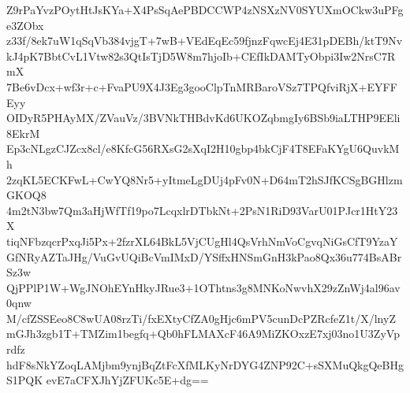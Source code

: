 Z9rPaYvzPOytHtJsKYa+X4PsSqAePBDCCWP4zNSXzNV0SYUXmOCkw3uPFge3ZObx
z33f/8ek7uW1qSqVb384vjgT+7wB+VEdEqEc59fjnzFqwcEj4E31pDEBh/ktT9Nv
kJ4pK7BbtCvL1Vtw82s3QtIsTjD5W8m7hjoIb+CEfIkDAMTyObpi3Iw2NrsC7RmX
7Be6vDcx+wf3r+c+FvaPU9X4J3Eg3gooClpTnMRBaroVSz7TPQfviRjX+EYFFEyy
OIDyR5PHAyMX/ZVauVz/3BVNkTHBdvKd6UKOZqbmgIy6BSb9iaLTHP9EEli8EkrM
Ep3cNLgzCJZcx8cl/e8KfcG56RXsG2sXqI2H10gbp4bkCjF4T8EFaKYgU6QuvkMh
2zqKL5ECKFwL+CwYQ8Nr5+yItmeLgDUj4pFv0N+D64mT2hSJfKCSgBGHlzmGKOQ8
4m2tN3bw7Qm3aHjWfTf19po7LcqxlrDTbkNt+2PsN1RiD93VarU01PJcr1HtY23X
tiqNFbzqcrPxqJi5Px+2fzrXL64BkL5VjCUgHl4QsVrhNmVoCgvqNiGsCfT9YzaY
GfNRyAZTaJHg/VuGvUQiBcVmIMxD/YSffxHNSmGnH3kPao8Qx36u774BsABrSz3w
QjPPlP1W+WgJNOhEYnHkyJRue3+1OThtns3g8MNKoNwvhX29zZnWj4al96av0qnw
M/cfZSSEeo8C8wUA08rzTi/fxEXtyCfZA0gHjc6mPV5cunDcPZRcfeZ1t/X/lnyZ
mGJh3zgb1T+TMZim1begfq+Qb0hFLMAXcF46A9MiZKOxzE7xj03no1U3ZyVprdfz
hdF8sNkYZoqLAMjbm9ynjBqZtFcXfMLKyNrDYG4ZNP92C+sSXMuQkgQeBHgS1PQK
evE7aCFXJhYjZFUKc5E+dg==
